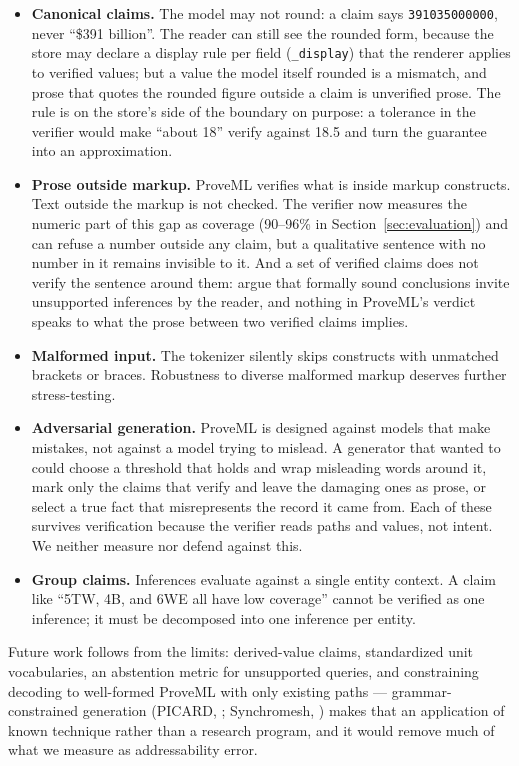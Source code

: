 \documentclass[11pt,a4paper]{article}
\begin{document}
\begin{itemize}[nosep]
    \item \textbf{Canonical claims.} The model may not round: a claim says \texttt{391035000000}, never ``\$391 billion''. The reader can still see the rounded form, because the store may declare a display rule per field (\texttt{\_display}) that the renderer applies to verified values; but a value the model itself rounded is a mismatch, and prose that quotes the rounded figure outside a claim is unverified prose. The rule is on the store's side of the boundary on purpose: a tolerance in the verifier would make ``about 18'' verify against 18.5 and turn the guarantee into an approximation.
    \item \textbf{Prose outside markup.} ProveML verifies what is inside markup constructs. Text outside the markup is not checked. The verifier now measures the numeric part of this gap as coverage (90--96\% in Section~\ref{sec:evaluation}) and can refuse a number outside any claim, but a qualitative sentence with no number in it remains invisible to it. And a set of verified claims does not verify the sentence around them: \citet{chan2026soundness} argue that formally sound conclusions invite unsupported inferences by the reader, and nothing in ProveML's verdict speaks to what the prose between two verified claims implies.
    \item \textbf{Malformed input.} The tokenizer silently skips constructs with unmatched brackets or braces. Robustness to diverse malformed markup deserves further stress-testing.
    \item \textbf{Adversarial generation.} ProveML is designed against models that make mistakes, not against a model trying to mislead. A generator that wanted to could choose a threshold that holds and wrap misleading words around it, mark only the claims that verify and leave the damaging ones as prose, or select a true fact that misrepresents the record it came from. Each of these survives verification because the verifier reads paths and values, not intent. We neither measure nor defend against this.
    \item \textbf{Group claims.} Inferences evaluate against a single entity context. A claim like ``5TW, 4B, and 6WE all have low coverage'' cannot be verified as one inference; it must be decomposed into one inference per entity.
\end{itemize}

\noindent Future work follows from the limits: derived-value claims, standardized unit vocabularies, an abstention metric for unsupported queries, and constraining decoding to well-formed ProveML with only existing paths --- grammar-constrained generation (PICARD, \citealp{picard}; Synchromesh, \citealp{synchromesh}) makes that an application of known technique rather than a research program, and it would remove much of what we measure as addressability error.
\end{document}

